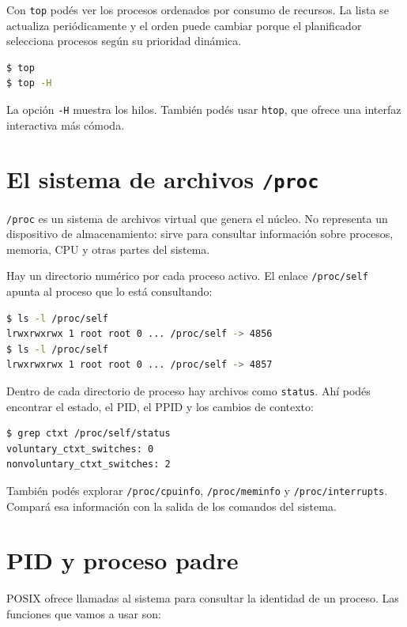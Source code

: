 \documentclass[11pt,a4paper]{article}
\begin{document}
Con \texttt{top} podés ver los procesos ordenados por consumo de recursos. La lista se actualiza periódicamente y el orden puede cambiar porque el planificador selecciona procesos según su prioridad dinámica.

\begin{lstlisting}[language=bash]
$ top
$ top -H
\end{lstlisting}

La opción \texttt{-H} muestra los hilos. También podés usar \texttt{htop}, que ofrece una interfaz interactiva más cómoda.

\section{El sistema de archivos \texttt{/proc}}

\texttt{/proc} es un sistema de archivos virtual que genera el núcleo. No representa un dispositivo de almacenamiento: sirve para consultar información sobre procesos, memoria, CPU y otras partes del sistema.

Hay un directorio numérico por cada proceso activo. El enlace \texttt{/proc/self} apunta al proceso que lo está consultando:

\begin{lstlisting}[language=bash]
$ ls -l /proc/self
lrwxrwxrwx 1 root root 0 ... /proc/self -> 4856
$ ls -l /proc/self
lrwxrwxrwx 1 root root 0 ... /proc/self -> 4857
\end{lstlisting}

Dentro de cada directorio de proceso hay archivos como \texttt{status}. Ahí podés encontrar el estado, el PID, el PPID y los cambios de contexto:

\begin{lstlisting}[language=bash]
$ grep ctxt /proc/self/status
voluntary_ctxt_switches: 0
nonvoluntary_ctxt_switches: 2
\end{lstlisting}

\begin{extrabox}
También podés explorar \texttt{/proc/cpuinfo}, \texttt{/proc/meminfo} y \texttt{/proc/interrupts}. Compará esa información con la salida de los comandos del sistema.
\end{extrabox}

\section{PID y proceso padre}

POSIX ofrece llamadas al sistema para consultar la identidad de un proceso. Las funciones que vamos a usar son:
\end{document}
